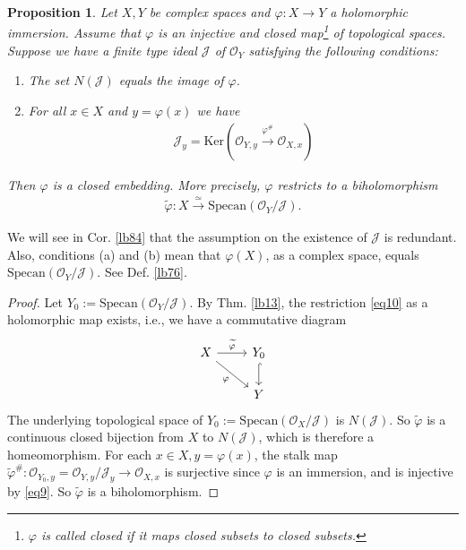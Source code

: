 \documentclass[12pt,b5paper,notitlepage]{report}
\theoremstyle{definition}
\theoremstyle{plain}
\newtheorem{pp}[df]{Proposition}
\newcommand{\mc}{\mathcal}
\newcommand{\wtd}{\widetilde}
\newcommand{\scr}{\mathscr}
\newcommand{\Ker}{\mathrm{Ker}}
\newcommand{\Specan}{\mathrm{Specan}}
\numberwithin{equation}{section}
\begin{document}
\begin{pp}\label{lb14}
Let $X,Y$ be complex spaces and  $\varphi:X\rightarrow Y$ a holomorphic immersion. Assume that $\varphi$ is an injective and closed map\footnote{$\varphi$ is called closed if it maps closed subsets to closed subsets.} of topological spaces. Suppose we have a finite type ideal $\mc J$ of $\scr O_Y$ satisfying the following conditions:
\begin{enumerate}
\item[(a)] The set $N(\mc J)$ equals the image of $\varphi$.
\item[(b)] For all $x\in X$ and $y=\varphi(x)$ we have
\begin{align}
\mc J_y=\Ker(\scr O_{Y,y}\xrightarrow{\varphi^\#}\scr O_{X,x})\label{eq9}
\end{align}
\end{enumerate}
Then $\varphi$ is a closed embedding. More precisely, $\varphi$ restricts to a biholomorphism
\begin{align}
\wtd\varphi:X\xrightarrow{\simeq}\Specan(\scr O_Y/\mc J).\label{eq10}
\end{align}
\end{pp}

We will see in Cor. \ref{lb84} that the assumption on the existence of $\mc J$ is redundant. Also, conditions (a) and (b) mean that $\varphi(X)$, as a complex space, equals $\Specan(\scr O_Y/\mc J)$. See Def. \ref{lb76}.






\begin{proof}
Let $Y_0:=\Specan(\scr O_Y/\mc J)$. By Thm. \ref{lb13}, the restriction \eqref{eq10} as a holomorphic map exists, i.e., we have a commutative diagram
\begin{equation*}
\begin{tikzcd}
X \arrow[r, "\wtd\varphi"] \arrow[rd, "\varphi"'] & Y_0 \arrow[d, hook] \\
                                  & Y                
\end{tikzcd}
\end{equation*}
The underlying topological space of $Y_0:=\Specan(\scr O_X/\mc J)$ is $N(\mc J)$. So $\wtd\varphi$ is a continuous closed bijection from $X$ to $N(\mc J)$, which is therefore a homeomorphism. For each $x\in X,y=\varphi(x)$, the stalk map $\wtd\varphi^\#:\scr O_{Y_0,y}=\scr O_{Y,y}/\mc J_y\rightarrow\scr O_{X,x}$ is surjective since $\varphi$ is an immersion, and is injective by \eqref{eq9}. So $\wtd\varphi$ is a biholomorphism.
\end{proof}
\end{document}
